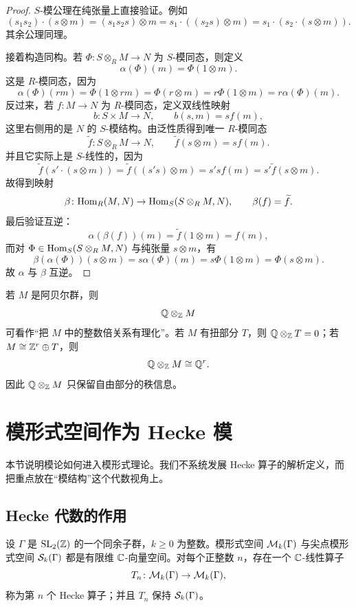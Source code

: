 \begin{proof}
$S$-模公理在纯张量上直接验证。例如
\[
(s_1s_2)\cdot (s\otimes m)=(s_1s_2s)\otimes m=s_1\cdot ((s_2s)\otimes m)=s_1\cdot (s_2\cdot (s\otimes m)).
\]
其余公理同理。

接着构造同构。若 $\Phi\colon S\otimes_R M\to N$ 为 $S$-模同态，则定义
\[
\alpha(\Phi)(m)=\Phi(1\otimes m).
\]
这是 $R$-模同态，因为
\[
\alpha(\Phi)(rm)=\Phi(1\otimes rm)=\Phi(r\otimes m)=r\Phi(1\otimes m)=r\alpha(\Phi)(m).
\]
反过来，若 $f\colon M\to N$ 为 $R$-模同态，定义双线性映射
\[
b\colon S\times M\to N,
\qquad b(s,m)=s f(m),
\]
这里右侧用的是 $N$ 的 $S$-模结构。由泛性质得到唯一 $R$-模同态
\[
\widetilde f\colon S\otimes_R M\to N,
\qquad \widetilde f(s\otimes m)=sf(m).
\]
并且它实际上是 $S$-线性的，因为
\[
\widetilde f(s'\cdot (s\otimes m))=\widetilde f((s's)\otimes m)=s'sf(m)=s'\widetilde f(s\otimes m).
\]
故得到映射
\[
\beta\colon \mathrm{Hom}_R(M,N)\to \mathrm{Hom}_S(S\otimes_R M,N),\qquad \beta(f)=\widetilde f.
\]
最后验证互逆：
\[
\alpha(\beta(f))(m)=\widetilde f(1\otimes m)=f(m),
\]
而对 $\Phi\in \mathrm{Hom}_S(S\otimes_R M,N)$ 与纯张量 $s\otimes m$，有
\[
\beta(\alpha(\Phi))(s\otimes m)=s\alpha(\Phi)(m)=s\Phi(1\otimes m)=\Phi(s\otimes m).
\]
故 $\alpha$ 与 $\beta$ 互逆。
\end{proof}

\begin{example}
若 $M$ 是阿贝尔群，则
\[
\mathbb{Q}\otimes_{\mathbb{Z}} M
\]
可看作“把 $M$ 中的整数倍关系有理化”。若 $M$ 有扭部分 $T$，则 $\mathbb{Q}\otimes_{\mathbb{Z}} T=0$；若 $M\cong \mathbb{Z}^r\oplus T$，则
\[
\mathbb{Q}\otimes_{\mathbb{Z}} M\cong \mathbb{Q}^r.
\]
因此 $\mathbb{Q}\otimes_{\mathbb{Z}} M$ 只保留自由部分的秩信息。
\end{example}

\section{模形式空间作为 Hecke 模}

本节说明模论如何进入模形式理论。我们不系统发展 Hecke 算子的解析定义，而把重点放在“模结构”这个代数视角上。

\subsection{Hecke 代数的作用}

设 $\Gamma$ 是 $\mathrm{SL}_2(\mathbb{Z})$ 的一个同余子群，$k\ge 0$ 为整数。模形式空间 $\mathcal{M}_k(\Gamma)$ 与尖点模形式空间 $\mathcal{S}_k(\Gamma)$ 都是有限维 $\mathbb{C}$-向量空间。对每个正整数 $n$，存在一个 $\mathbb{C}$-线性算子
\[
T_n\colon \mathcal{M}_k(\Gamma)\to \mathcal{M}_k(\Gamma),
\]
称为第 $n$ 个 Hecke 算子；并且 $T_n$ 保持 $\mathcal{S}_k(\Gamma)$。

